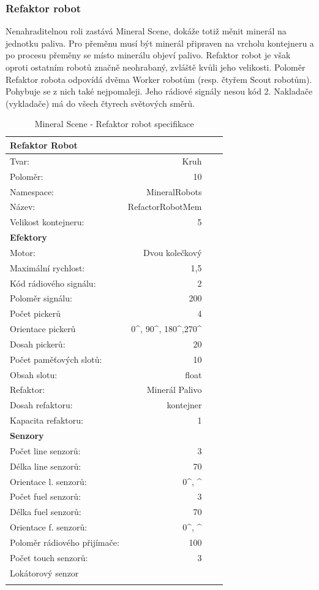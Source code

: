 \subsubsection{Refaktor robot}
Nenahraditelnou roli zastává Mineral Scene, dokáže totiž měnit minerál na jednotku paliva. Pro přeměnu musí být minerál připraven na vrcholu kontejneru a po procesu přeměny se místo minerálu objeví palivo. Refaktor robot je však oproti ostatním robotů značně neohrabaný, zvláště kvůli jeho velikosti. Poloměr Refaktor robota odpovídá dvěma Worker robotům (resp. čtyřem Scout robotům). Pohybuje se z nich také nejpomaleji. Jeho rádiové signály nesou kód 2. Nakladače (vykladače) má do všech čtyrech světových směrů. 
\par  
\begin{table}[h]\centering
	\begin{tabular}{l@{\hspace{1.0cm}}D{.}{,}{2.2}D{.}{,}{2.2}D{.}{,}{2.3}}
		\toprule
		\textbf{Refaktor Robot} \\
		\midrule
		Tvar: & Kruh\\
		Poloměr: & 10 \\
		Namespace: & MineralRobots\\
		Název: & RefactorRobotMem \\
		Velikost kontejneru: & 5\\
		\midrule
		\textbf{Efektory} \\
		\midrule
		Motor: & Dvou kolečkový \\
		Maximální rychlost: & 1,5 \\
		Kód rádiového signálu: & 2\\
		Poloměr signálu: & 200\\
		Počet pickerů & 4\\
		Orientace pickerů & 0^\circ, 90^\circ, 180^\circ,270^\circ\\ 
		Dosah pickerů: & 20\\
		Počet paměťových slotů: &10 \\
		Obsah slotu: & float\\
		Refaktor: & Minerál \Rightarrow Palivo \\
		Dosah refaktoru:  & kontejner \\
		Kapacita refaktoru: & 1\\ 
		\midrule 
		\textbf{Senzory} \\
		\midrule
		Počet line senzorů: &  3\\
		Délka line senzorů: & 70\\
		Orientace l. senzorů: & 0^\circ, ^\circ\\
		Počet fuel senzorů: &  3\\
		Délka fuel senzorů: & 70\\
		Orientace f. senzorů: & 0^\circ, ^\circ\\
		Poloměr rádiového přijímače: & 100 \\
		Počet touch senzorů: & 3 \\  
		Lokátorový senzor\\ 
		\bottomrule
	\end{tabular}
	\caption{Mineral Scene - Refaktor robot specifikace }
	\label{tab04:MineralRefactor}
\end{table}
\clearpage
